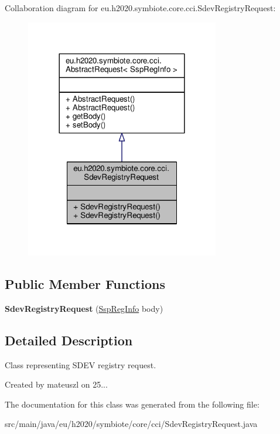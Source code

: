 Collaboration diagram for eu.\+h2020.\+symbiote.\+core.\+cci.\+Sdev\+Registry\+Request\+:\nopagebreak
\begin{figure}[H]
\begin{center}
\leavevmode
\includegraphics[width=240pt]{classeu_1_1h2020_1_1symbiote_1_1core_1_1cci_1_1SdevRegistryRequest__coll__graph}
\end{center}
\end{figure}
\subsection*{Public Member Functions}
\begin{DoxyCompactItemize}
\item 
\mbox{\label{classeu_1_1h2020_1_1symbiote_1_1core_1_1cci_1_1SdevRegistryRequest_afdab0ca81a0fbf5c4b22e853acaee670}} 
{\bfseries Sdev\+Registry\+Request} (\hyperlink{classeu_1_1h2020_1_1symbiote_1_1cloud_1_1model_1_1ssp_1_1SspRegInfo}{Ssp\+Reg\+Info} body)
\end{DoxyCompactItemize}


\subsection{Detailed Description}
Class representing S\+D\+EV registry request.

Created by mateuszl on 25... 

The documentation for this class was generated from the following file\+:\begin{DoxyCompactItemize}
\item 
src/main/java/eu/h2020/symbiote/core/cci/Sdev\+Registry\+Request.\+java\end{DoxyCompactItemize}

